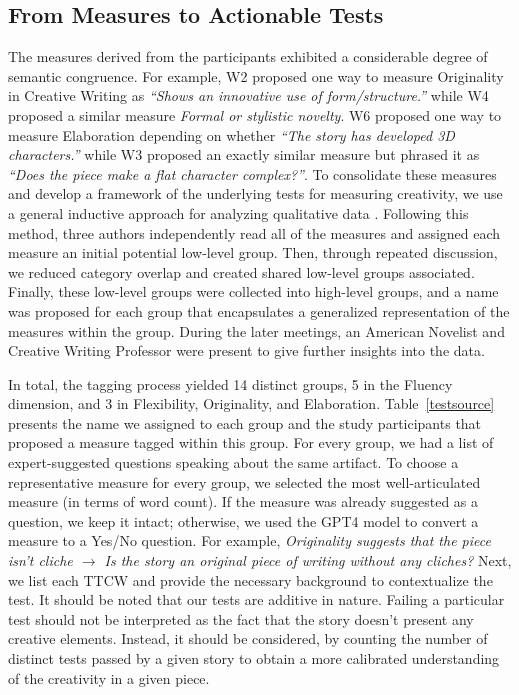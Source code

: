 \subsection{From Measures to Actionable Tests}
The measures derived from the participants exhibited a considerable degree of semantic congruence. For example, W2 proposed one way to measure Originality in Creative Writing as \textit{``Shows an innovative use of form/structure.''} while W4 proposed a similar measure \textit{Formal or stylistic novelty}.
W6 proposed one way to measure Elaboration depending on whether \textit{``The story has developed 3D characters.''} while W3 proposed an exactly similar measure but phrased it as \textit{``Does the piece make a flat character complex?''}. To consolidate these measures and develop a framework of the underlying tests for measuring creativity, we use a general inductive approach for analyzing qualitative data \cite{thomas2006general}. Following this method, three authors independently read all of the measures and assigned each measure an initial potential low-level group. Then, through repeated discussion, we reduced category overlap and created shared low-level groups associated. Finally, these low-level groups were collected into high-level groups, and a name was proposed for each group that encapsulates a generalized representation of the measures within the group. During the later meetings, an American Novelist and Creative Writing Professor were present to give further insights into the data.

In total, the tagging process yielded 14 distinct groups, 5 in the Fluency dimension, and 3 in Flexibility, Originality, and Elaboration. Table~\ref{testsource} presents the name we assigned to each group and the study participants that proposed a measure tagged within this group. For every group, we had a list of expert-suggested questions speaking about the same artifact. To choose a representative measure for every group, we selected the most well-articulated measure (in terms of word count). If the measure was already suggested as a question, we keep it intact; otherwise, we used the GPT4 model to convert a measure to a Yes/No question. For example, \textit{Originality suggests that the piece isn’t cliche $\rightarrow$ Is the story an original piece of writing without any
cliches?}
Next, we list each TTCW and provide the necessary background to contextualize the test. It should be noted that our tests are additive in nature. Failing a particular test should not be interpreted as the fact that the story doesn’t present any creative elements. Instead, it should be considered, by counting the number of distinct tests passed by a given story to obtain a more calibrated understanding of the creativity in a given piece.

